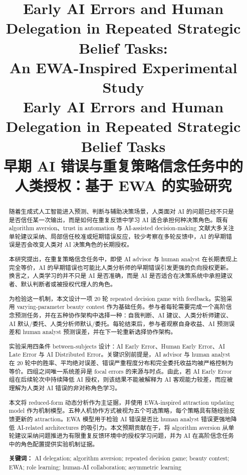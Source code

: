 \documentclass[12pt]{article}
\title{Early AI Errors and Human Delegation in Repeated Strategic Belief Tasks:\\An EWA-Inspired Experimental Study\\
\large Early AI Errors and Human Delegation in Repeated Strategic Belief Tasks\\
\large 早期 AI 错误与重复策略信念任务中的人类授权：基于 EWA 的实验研究}
\author{}
\date{}
\begin{document}
\maketitle

\begin{abstract}
随着生成式人工智能进入预测、判断与辅助决策场景，人类面对 AI 的问题已经不只是是否信任某一次输出，而是如何在重复反馈中学习 AI 适合承担何种决策角色。既有 algorithm aversion、trust in automation 与 AI-assisted decision-making 文献大多关注单轮建议采纳、局部信任校准或短期错误反应，较少考察在多轮反馈中，AI 的早期错误是否会改变人类对 AI 决策角色的长期授权。

本研究提出，在重复策略信念任务中，即使 AI advisor 与 human analyst 在长期表现上完全等价，AI 的早期错误也可能比人类分析师的早期错误引发更强的负向授权更新。换言之，人类学习的并不只是 AI 是否准确，而是 AI 是否适合在决策系统中承担建议者、默认判断者或被授权代理人的角色。

为检验这一机制，本文设计一项 20 轮 repeated decision game with feedback。实验采用 varying-parameter beauty contest 作为基础任务。参与者每轮需要完成一个高阶信念预测任务，并在五种协作架构中选择一种：自我判断、AI 建议、人类分析师建议、AI 默认/委托、人类分析师默认/委托。每轮结束后，参与者观察自身收益、AI 预测误差和 human analyst 预测误差，并在下一轮重新选择协作架构。

实验采用四条件 between-subjects 设计：AI Early Error、Human Early Error、AI Late Error 与 AI Distributed Error。关键识别前提是，AI advisor 与 human analyst 在 20 轮中的胜率、平均绝对误差、错误严重程度分布和完全委托收益均被严格控制为等价。四组之间唯一系统差异是 focal errors 的来源与时点。由此，若 AI Early Error 组在后续轮次中持续降低 AI 授权，则该结果不能被解释为 AI 客观能力较差，而应被理解为人类对 AI 错误的非对称角色学习。

本文将 reduced-form 动态分析作为主证据，并使用 EWA-inspired attraction updating model 作为机制模型。五种人机协作方式被视为五个可选策略，每个策略具有随经验反馈更新的 attraction。EWA 模型用于检验 AI 错误是否比 human analyst 错误更强地降低 AI-related architectures 的吸引力。本文预期贡献在于，将 algorithm aversion 从单轮建议采纳问题推进为有限重复反馈环境中的授权学习问题，并为 AI 在高阶信念任务中的角色配置提供实验机制证据。

\vspace{1em}
\noindent\textbf{关键词：} AI delegation; algorithm aversion; repeated decision game; beauty contest; EWA; role learning; human-AI collaboration; asymmetric learning
\end{abstract}
\end{document}
